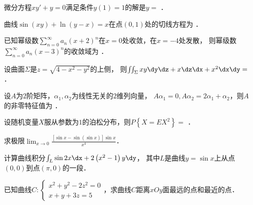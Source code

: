 \documentclass[plain,noanswer,medmath]{../../template/jnuexam}
\begin{document}


\begin{problem}
微分方程$xy' + y = 0$满足条件$y(1) = 1$的解是$y =$ \fillin{}．
\end{problem}


\begin{problem}
曲线$\sin (xy) + \ln (y - x) = x$在点$\left(0,1 \right)$处的切线方程为 \fillin{}．
\end{problem}


\begin{problem}
已知幂级数$\sum_{n = 0}^{\infty}a_n \left(x + 2 \right)^n$在$x = 0$处收敛，在$x = - 4$处发散，
则幂级数\goodbreak$\sum_{n = 0}^{\infty}a_n (x - 3)^n$的收敛域为 \fillin{}．
\end{problem}


\begin{problem}
设曲面$\Sigma$是$z = \sqrt{4 - x^2 - y^2}$的上侧，
则$\iint_{\Sigma}xy\dy\dz + x\dz\dx + x^2 \dx\dy =$ \fillin{}．
\end{problem}


\begin{problem}
设$A$为$2$阶矩阵，$\alpha_1,\alpha_2$为线性无关的$2$维列向量，
$A\alpha_1 = 0,A\alpha_2 = 2\alpha_1 + \alpha_2$，则$A$的非零特征值为 \fillin{}．
\end{problem}


\begin{problem}
设随机变量$X$服从参数为$1$的泊松分布，则$P\left\{X = EX^2 \right\} =$ \fillin{}．
\end{problem}




\begin{problem}[points=9]
求极限$\lim_{x \to 0} \frac{\left[\sin x - \sin \left(\sin x \right) \right]\sin x}{x^4}$．
\end{problem}


\begin{problem}[points=9]
计算曲线积分$\int_L \sin 2x\dx + 2\left(x^2 - 1 \right)y\dy$，
其中$L$是曲线$y = \sin x$上从点$\left(0,0 \right)$到点$\left(\pi ,0 \right)$的一段．
\end{problem}


\begin{problem}[points=11]
已知曲线$C:\begin{cases}
  x^2 + y^2 - 2z^2 = 0 \\
  x + y + 3z = 5
\end{cases}$，求曲线$C$距离$xOy$面最远的点和最近的点．
\end{problem}
\end{document}
